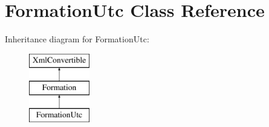 \hypertarget{classFormationUtc}{\section{Formation\+Utc Class Reference}
\label{classFormationUtc}
}
Inheritance diagram for Formation\+Utc\+:\begin{figure}[H]
\begin{center}
\leavevmode
\includegraphics[height=3.000000cm]{classFormationUtc}
\end{center}
\end{figure}
